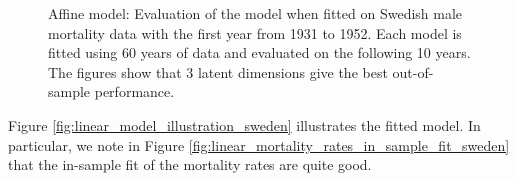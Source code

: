 \documentclass[11pt]{article}
\begin{document}
\begin{figure}
\begin{subfigure}[t]{0.49\textwidth}
        \caption{}
        \label{fig:model_evaluation_sweden_R2}
    \end{subfigure}
    \hfill
        \caption{Affine model: Evaluation of the model when fitted on Swedish male mortality data with the first year from 1931 to 1952. Each model is fitted using 60 years of data and evaluated on the following 10 years. The figures show that 3 latent dimensions give the best out-of-sample performance.}
        \label{fig:affine_model_evaluation_sweden}
\end{figure}
Figure \ref{fig:linear_model_illustration_sweden} illustrates the fitted model. In particular, we note in Figure \ref{fig:linear_mortality_rates_in_sample_fit_sweden} that the in-sample fit of the mortality rates  are quite good.
\end{document}
